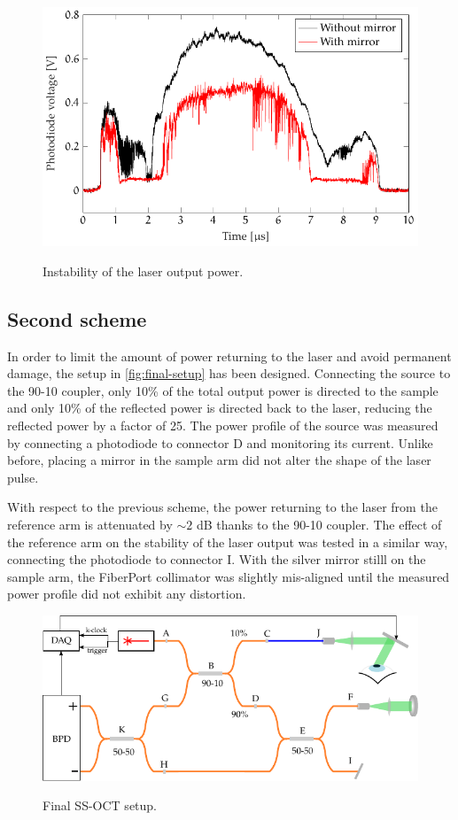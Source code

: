 \begin{figure}[bth]
	\myfloatalign
	{\includegraphics[width=0.8\linewidth]{gfx/ch3/first-scheme-instability}}
	\caption{Instability of the laser output power.}\label{fig:first-scheme-instability}
\end{figure}




\subsection{Second scheme}
In order to limit the amount of power returning to the laser and avoid permanent damage, the setup in \autoref{fig:final-setup} has been designed. Connecting the source to the 90-10 coupler, only 10\% of the total output power is directed to the sample and only 10\% of the reflected power is directed back to the laser, reducing the reflected power by a factor of 25. The power profile of the source was measured by connecting a photodiode to connector D and monitoring its current. Unlike before, placing a mirror in the sample arm did not alter the shape of the laser pulse. 

With respect to the previous scheme, the power returning to the laser from the reference arm is attenuated by $\sim 2$ dB thanks to the 90-10 coupler. 
The effect of the reference arm on the stability of the laser output was tested in a similar way, connecting the photodiode to connector I. With the silver mirror stilll on the sample arm, the FiberPort collimator was slightly mis-aligned until the measured power profile did not exhibit any distortion. 

\begin{figure}[bth]
	\myfloatalign
	{\includegraphics[width=\linewidth]{gfx/setup-diagrams/final-setup-2.pdf}}
	\caption{Final SS-OCT setup.}\label{fig:final-setup}
\end{figure}

